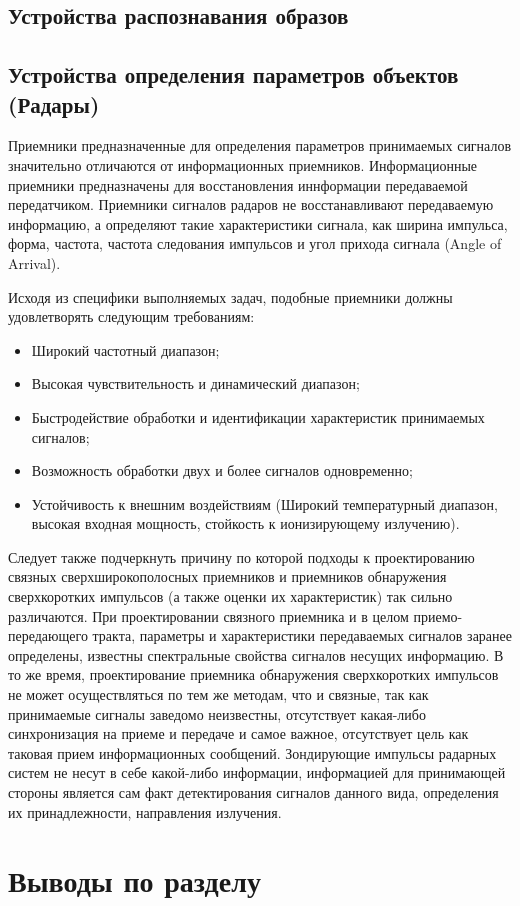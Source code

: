 \subsection{Устройства распознавания образов}

\subsection{Устройства определения параметров объектов (Радары)}
Приемники предназначенные для определения параметров принимаемых сигналов значительно отличаются от информационных приемников. Информационные приемники предназначены для восстановления иннформации передаваемой передатчиком. Приемники сигналов радаров не восстанавливают передаваемую информацию, а определяют такие характеристики сигнала, как ширина импульса, форма, частота, частота следования импульсов и угол прихода сигнала (Angle of Arrival).

Исходя из специфики выполняемых задач, подобные приемники должны удовлетворять следующим требованиям:
\begin{itemize}
\item Широкий частотный диапазон;

\item Высокая чувствительность и динамический диапазон;

\item Быстродействие обработки и идентификации характеристик принимаемых сигналов;

\item Возможность обработки двух и более сигналов одновременно;

\item Устойчивость к внешним воздействиям (Широкий температурный диапазон, высокая входная мощность, стойкость к ионизирующему излучению).
\end{itemize}

 Следует также подчеркнуть причину по которой подходы к проектированию связных сверхширокополосных приемников и приемников обнаружения сверхкоротких импульсов (а также оценки их характеристик) так сильно различаются. При проектировании связного приемника и в целом приемо-передающего тракта, параметры и характеристики передаваемых сигналов заранее определены, известны спектральные свойства сигналов несущих информацию.
 В то же время, проектирование приемника обнаружения сверхкоротких импульсов не может осуществляться по тем же методам, что и связные, так как принимаемые сигналы заведомо неизвестны, отсутствует какая-либо синхронизация на приеме и передаче и самое важное, отсутствует цель как таковая прием информационных сообщений. Зондирующие импульсы радарных систем не несут в себе какой-либо информации, информацией для принимающей стороны является сам факт детектирования сигналов данного вида, определения их принадлежности, направления излучения.

\section{Выводы по разделу}